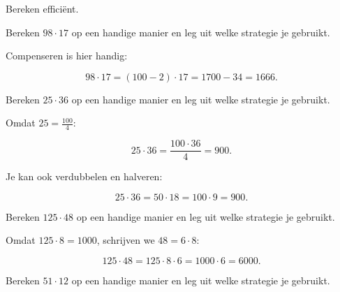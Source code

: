 \documentclass{ximera}
\begin{document}
\begin{oefening}{\oefU\ESS}

Bereken efficiënt.

\begin{question}

Bereken \(98\cdot17\) op een handige manier en leg uit welke strategie je
gebruikt.

\begin{oplossing}

Compenseren is hier handig:

\[
98\cdot17
=
(100-2)\cdot17
=
1700-34
=
1666.
\]

\end{oplossing}

\end{question}


\begin{question}

Bereken \(25\cdot36\) op een handige manier en leg uit welke strategie je
gebruikt.

\begin{oplossing}

Omdat \(25=\frac{100}{4}\):

\[
25\cdot36
=
\frac{100\cdot36}{4}
=
900.
\]

Je kan ook verdubbelen en halveren:

\[
25\cdot36
=
50\cdot18
=
100\cdot9
=
900.
\]

\end{oplossing}

\end{question}


\begin{question}

Bereken \(125\cdot48\) op een handige manier en leg uit welke strategie je
gebruikt.

\begin{oplossing}

Omdat \(125\cdot8=1000\), schrijven we \(48=6\cdot8\):

\[
125\cdot48
=
125\cdot8\cdot6
=
1000\cdot6
=
6000.
\]

\end{oplossing}

\end{question}


\begin{question}

Bereken \(51\cdot12\) op een handige manier en leg uit welke strategie je
gebruikt.


\end{question}
\end{oefening}
\end{document}
